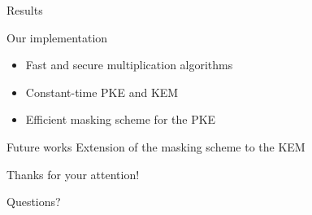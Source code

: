 \begin{frame}{Results}
    \begin{block}{Our implementation}
        \begin{itemize}
            \item Fast and secure multiplication algorithms
            \item Constant-time PKE and KEM
            \item Efficient masking scheme for the PKE
        \end{itemize}
    \end{block}

    \begin{block}{Future works}
        Extension of the masking scheme to the KEM
    \end{block}
\end{frame}

\begin{frame}{Thanks for your attention!}
    \begin{center}
        \Huge{Questions?}
    \end{center}
\end{frame}